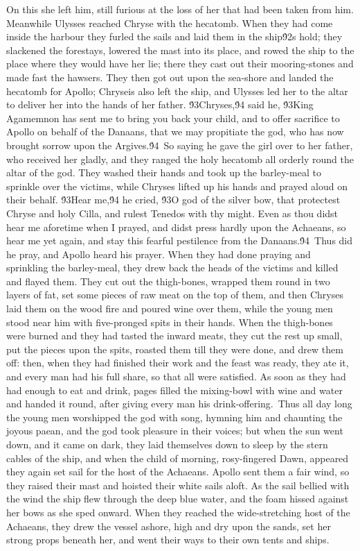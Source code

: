 {On this she left him, still furious at the loss of her that had been taken from him. Meanwhile Ulysses reached Chryse with the hecatomb. When they had come inside the harbour they furled the sails and laid them in the ship\'92s hold; they slackened the forestays, lowered the mast into its place, and rowed the ship to the place where they would have her lie; there they cast out their mooring-stones and made fast the hawsers. They then got out upon the sea-shore and landed the hecatomb for Apollo; Chryseis also left the ship, and Ulysses led her to the altar to deliver her into the hands of her father. \'93Chryses,\'94 said he, \'93King Agamemnon has sent me to bring you back your child, and to offer sacrifice to Apollo on behalf of the Danaans, that we may propitiate the god, who has now brought sorrow upon the Argives.\'94\
So saying he gave the girl over to her father, who received her gladly, and they ranged the holy hecatomb all orderly round the altar of the god. They washed their hands and took up the barley-meal to sprinkle over the victims, while Chryses lifted up his hands and prayed aloud on their behalf. \'93Hear me,\'94 he cried, \'93O god of the silver bow, that protectest Chryse and holy Cilla, and rulest Tenedos with thy might. Even as thou didst hear me aforetime when I prayed, and didst press hardly upon the Achaeans, so hear me yet again, and stay this fearful pestilence from the Danaans.\'94\
Thus did he pray, and Apollo heard his prayer. When they had done praying and sprinkling the barley-meal, they drew back the heads of the victims and killed and flayed them. They cut out the thigh-bones, wrapped them round in two layers of fat, set some pieces of raw meat on the top of them, and then Chryses laid them on the wood fire and poured wine over them, while the young men stood near him with five-pronged spits in their hands. When the thigh-bones were burned and they had tasted the inward meats, they cut the rest up small, put the pieces upon the spits, roasted them till they were done, and drew them off: then, when they had finished their work and the feast was ready, they ate it, and every man had his full share, so that all were satisfied. As soon as they had had enough to eat and drink, pages filled the mixing-bowl with wine and water and handed it round, after giving every man his drink-offering.\
Thus all day long the young men worshipped the god with song, hymning him and chaunting the joyous paean, and the god took pleasure in their voices; but when the sun went down, and it came on dark, they laid themselves down to sleep by the stern cables of the ship, and when the child of morning, rosy-fingered Dawn, appeared they again set sail for the host of the Achaeans. Apollo sent them a fair wind, so they raised their mast and hoisted their white sails aloft. As the sail bellied with the wind the ship flew through the deep blue water, and the foam hissed against her bows as she sped onward. When they reached the wide-stretching host of the Achaeans, they drew the vessel ashore, high and dry upon the sands, set her strong props beneath her, and went their ways to their own tents and ships.\
}
